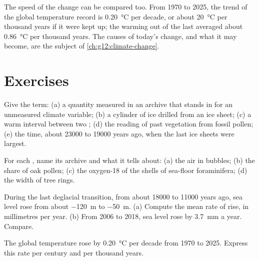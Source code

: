 The speed of the change can be compared too. From 1970 to 2025, the trend of
the global temperature record is \qty{0.20}{\degreeCelsius} per decade, or
about \qty{20}{\degreeCelsius} per thousand years if it were kept up; the
warming out of the last  averaged about
\qty{0.86}{\degreeCelsius} per thousand years. The causes of today's change,
and what it may become, are the subject of \cref{ch:g12:climate-change}.

\section{Exercises}

\begin{exercise}[$\star$]\label{exo:g12:past-climates:1}
Give the term: (a) a quantity measured in an archive that stands in for an
unmeasured climate variable; (b) a cylinder of ice drilled from an ice sheet;
(c) a warm interval between two ; (d) the reading of past
vegetation from fossil pollen; (e) the time, about \num{23000} to \num{19000}
years ago, when the last ice sheets were largest.
\end{exercise}

\begin{exercise}[$\star$]\label{exo:g12:past-climates:2}
For each , name its archive and what it tells about: (a) the air in
bubbles; (b) the share of oak pollen; (c) the oxygen-18 of the shells of
sea-floor foraminifera; (d) the width of tree rings.
\end{exercise}

\begin{exercise}[$\star$]\label{exo:g12:past-climates:3}
During the last deglacial transition, from about \num{18000} to \num{11000}
years ago, sea level rose from about \qty{-120}{m} to \qty{-50}{m}. (a) Compute
the mean rate of rise, in millimetres per year. (b) From 2006 to 2018, sea
level rose by \qty{3.7}{mm} a year. Compare.
\end{exercise}

\begin{exercise}[$\star$]\label{exo:g12:past-climates:4}
The global temperature rose by \qty{0.20}{\degreeCelsius} per decade from
1970 to 2025. Express this rate per century and per thousand years.
\end{exercise}

